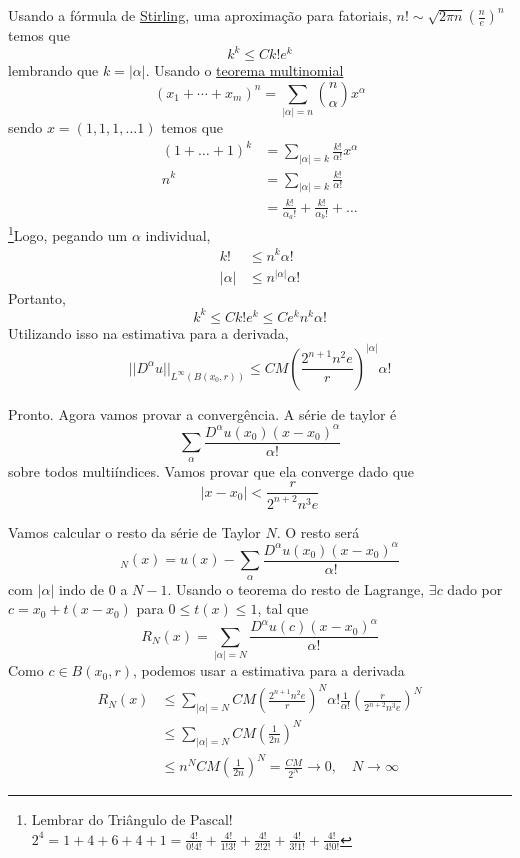 \documentclass[11pt]{article}
\begin{document}
Usando a fórmula de \href{https://en.wikipedia.org/wiki/Stirling\%27s_approximation}{Stirling}, uma aproximação para fatoriais, \( n! \sim \sqrt{2 \pi n}\left(\frac{n}{e}\right)^n \) temos que \[ k^k \leq C k! e^k \] lembrando que \( k = |\alpha| \). Usando o \href{https://en.wikipedia.org/wiki/Multinomial_theorem}{teorema multinomial} \[ (x_1+\cdots+x_m)^n = \sum_{|\alpha|=n}{\binom{n}{\alpha}}x^\alpha \]sendo \( x = (1, 1, 1, \ldots 1) \) temos que\begin{align*}
	(1 + \ldots +1)^k &= \sum_{| \alpha | = k} \frac{k!}{\alpha !} x^{\alpha} \\
	n^k &=  \sum_{| \alpha | = k} \frac{k!}{\alpha !} \\
	&= \frac{k!}{\alpha_a !} + \frac{k!}{\alpha_b !} + \ldots
\end{align*} \footnote{Lembrar do Triângulo de Pascal! \( 2^4 = 1 + 4 + 6 + 4 + 1 = \frac{4!}{0!4!} + \frac{4!}{1!3!} + \frac{4!}{2!2!} + \frac{4!}{3!1!} + \frac{4!}{4!0!} \) }Logo, pegando um \( \alpha \) individual, \begin{align*}
k ! &\leq n^k \alpha !\\
 | \alpha |  &\leq n^{| \alpha |} \alpha ! 
\end{align*} Portanto, \[ k^k \leq C k! e^k \leq C e^k n^k \alpha !  \]
Utilizando isso na estimativa para a derivada,
\[ || D^\alpha u ||_{L^\infty (B(x_0,r))}  \leq C M \left ( \frac{ 2^{n+1} n^2 e }{r} \right )^{| \alpha | } \alpha ! \]

Pronto. Agora vamos provar a convergência. A série de taylor é \[ \sum_{\alpha} \frac{D^\alpha u(x_0) (x-x_0)^\alpha}{\alpha !}  \] sobre todos multiíndices. Vamos provar que ela converge dado que \[   | x - x_0 | < \frac{r}{2^{n+2} n^3 e } \]

Vamos calcular o resto da série de Taylor \( N \). O resto será \[ _N (x) = u(x) - \sum_{\alpha} \frac{D^\alpha u(x_0) (x-x_0)^\alpha}{\alpha !}  \] com \( |\alpha| \) indo de 0 a \( N-1 \). Usando o teorema do resto de Lagrange, \( \exists c \) dado por \(c = x_0 + t (x-x_0) \) para \( 0\leq t(x) \leq 1 \), tal que \[ R_N (x) = \sum_{| \alpha | = N} \frac{D^\alpha u(c) (x-x_0)^\alpha}{\alpha !}  \] Como \( c \in B(x_0,r) \), podemos usar a estimativa para a derivada \begin{align*}
	R_N (x) &\leq \sum_{| \alpha | = N} C M \left ( \frac{ 2^{n+1} n^2 e }{r} \right )^{N } \alpha !  \frac{1}{\alpha !} \left ( \frac{r}{2^{n+2} n^3 e } \right )^N\\
	&\leq  \sum_{| \alpha | = N} C M \left ( \frac{1}{2n} \right )^N\\
	&\leq  n^N C M \left ( \frac{1}{2n} \right )^N = \frac{CM}{2^N} \rightarrow 0, \quad N \rightarrow \infty 
\end{align*}
\end{document}
